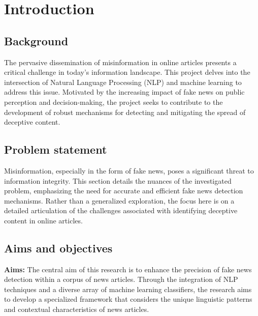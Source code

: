 \chapter{Introduction}
\label{ch:into} %



\section{Background}
\label{sec:into_back}
The pervasive dissemination of misinformation in online articles presents a critical challenge in today's information landscape. This project delves into the intersection of Natural Language Processing (NLP) and machine learning to address this issue. Motivated by the increasing impact of fake news on public perception and decision-making, the project seeks to contribute to the development of robust mechanisms for detecting and mitigating the spread of deceptive content. 

\section{Problem statement}
\label{sec:intro_prob_art}
Misinformation, especially in the form of fake news, poses a significant threat to information integrity. This section details the nuances of the investigated problem, emphasizing the need for accurate and efficient fake news detection mechanisms. Rather than a generalized exploration, the focus here is on a detailed articulation of the challenges associated with identifying deceptive content in online articles. 

\section{Aims and objectives}
\label{sec:intro_aims_obj}
\textbf{Aims:} The central aim of this research is to enhance the precision of fake news detection within a corpus of news articles. Through the integration of NLP techniques and a diverse array of machine learning classifiers, the research aims to develop a specialized framework that considers the unique linguistic patterns and contextual characteristics of news articles. 

